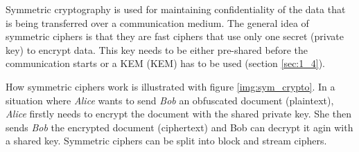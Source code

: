 Symmetric cryptography is used for maintaining confidentiality of the data that is being transferred over a communication medium. The general idea of symmetric ciphers is that they are fast ciphers that use only one secret (private key) to encrypt data. This key needs to be either pre-shared before the communication starts or a KEM ({\acl{KEM}}) has to be used (section \ref{sec:1_4}).

How symmetric ciphers work is illustrated with figure \ref{img:sym_crypto}. In a situation where \textit{Alice} wants to send \textit{Bob} an obfuscated document (plaintext), \textit{Alice} firstly needs to encrypt the document with the shared private key. She then sends \textit{Bob} the encrypted document (ciphertext) and Bob can decrypt it agin with a shared key. Symmetric ciphers can be split into block and stream ciphers.



